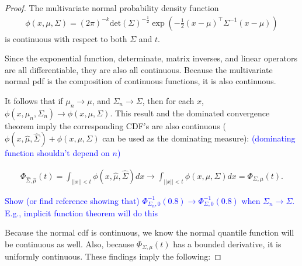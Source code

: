 \documentclass{article}
\newcommand{\pf}{\Phi}
\begin{document}
\begin{proof}
	The multivariate normal probability density function
\begin{align*}
	\phi(x, \mu, \Sigma) = \left(2\pi\right)^{-k} \text{det}\left({\Sigma}\right)^{- \frac{1}{2}} \exp\left(-\frac{1}{2} (x - \mu)^\top \Sigma^{-1}(x - \mu)\right) 
\end{align*}	
is continuous with respect to both $\Sigma$ and $t$.

Since the exponential function, determinate, matrix inverses, and linear operators are all differentiable, they are also all continuous.  Because the multivariate normal pdf is the composition of continuous functions, it is also continuous.

It follows that if $\mu_n \rightarrow \mu$, and $\Sigma_n \rightarrow \Sigma$, then for each $x$, $\phi(x, \mu_n, \Sigma_n) \rightarrow \phi(x, \mu, \Sigma)$.
This result and the dominated convergence theorem imply the corresponding CDF's are also continuous ($\phi(x, \hat{\mu}, \hat{\Sigma}) + \phi(x, \mu, \Sigma)$ can be used as the dominating measure): \textcolor{blue}{(dominating function shouldn't depend on $n$)}

\begin{align*}
	\pf_{\hat{\Sigma}, \hat{\mu}}\left(t \right) = \int_{||x|| < t} \phi(x, \hat{\mu}, \hat{\Sigma})dx \rightarrow \int_{||x|| < t} \phi(x, \mu, \Sigma)dx = \Phi_{\Sigma, \mu}(t).
\end{align*}

\textcolor{blue}{Show (or find reference showing that) $\Phi_{\Sigma_n,0}^{-1}(0.8)\rightarrow \Phi_{\Sigma,0}^{-1}(0.8)$ when $\Sigma_n\rightarrow \Sigma$. E.g., implicit function theorem will do this}

Because the normal cdf is continuous, we know the normal quantile function will be continuous as well. Also, because $\Phi_{\Sigma, \mu}(t)$ has a bounded derivative, it is uniformly continuous.  These findings imply the following:


\end{proof}
\end{document}
